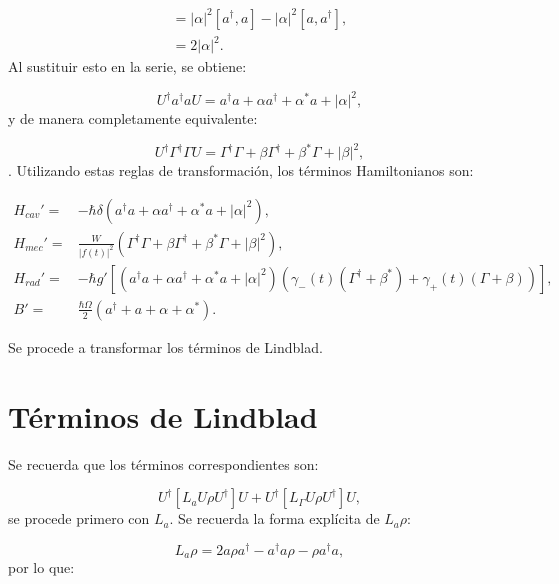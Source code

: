 \documentclass[a4paper,10pt]{report}
\begin{document}
\begin{align*}
[\alpha a^{\dagger} + \alpha^* a,\alpha a^\dagger - \alpha^*a] = |\alpha|^2[a^{\dagger},a]-|\alpha|^2[a,a^{\dagger}],\\
=2|\alpha|^2.
\end{align*} Al sustituir esto en la serie, se obtiene:

\begin{equation}
U^\dagger a^\dagger a U = a^\dagger a +\alpha a^\dagger + \alpha^* a + |\alpha|^2,
\end{equation} y de manera completamente equivalente:

\begin{equation}
U^\dagger \Gamma^\dagger \Gamma U = \Gamma^\dagger \Gamma +\beta \Gamma^\dagger + \beta^* \Gamma + |\beta|^2,
\end{equation}. Utilizando estas reglas de transformación, los términos Hamiltonianos son:

\begin{align}
H_{cav}' =& -\hbar \delta(a^{\dagger}a +\alpha a^{\dagger}+\alpha^* a + |\alpha|^2),\\
H_{mec}' =& \frac{W}{|f(t)|^2}(\Gamma^{\dagger}\Gamma + \beta \Gamma^{\dagger} + \beta^* \Gamma + |\beta|^2 ),\\
H_{rad}'=&-\hbar g'[(a^{\dagger}a +\alpha a^{\dagger}+\alpha^* a + |\alpha|^2)(\gamma_-(t)(\Gamma^{\dagger}+\beta^*)+\gamma_+(t)(\Gamma+\beta))],\\
B' =& \frac{\hbar \Omega}{2}(a^{\dagger} + a +\alpha + \alpha^*).
\end{align}

Se procede a transformar los términos de Lindblad.

\section{Términos de Lindblad}

Se recuerda que los términos correspondientes son:

\begin{equation}
U^\dagger [L_aU\rho U^\dagger]U + U^\dagger [L_\Gamma U\rho U^\dagger]U,
\end{equation} se procede primero con $L_a$. Se recuerda la forma explícita de $L_a \rho$:

\begin{equation}
L_a\rho = 2a\rho a^\dagger - a^\dagger a \rho - \rho a^\dagger a,
\end{equation} por lo que:
\end{document}
